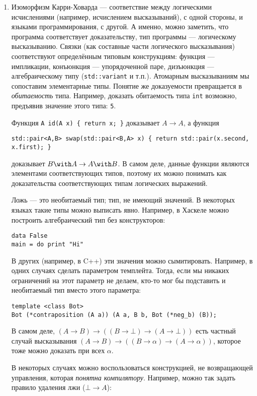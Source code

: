 \documentclass[10pt,a4paper,oneside]{article}
\begin{document}
\begin{enumerate}
\item Изоморфизм Карри-Ховарда --- соответствие между логическими исчислениями (например, исчислением высказываний), с одной стороны, и 
языками программирования, с другой. А именно, можно заметить, что программа соответствует доказательству, тип программы --- 
логическому высказыванию. Связки (как составные части логического высказывания) соответствуют определённым типовым конструкциям:
функция --- импликации, конъюнкция --- упорядоченной паре, дизъюнкция --- алгебраическому типу (\verb!std::variant! и т.п.).
Атомарным высказываниям мы сопоставим элементарные типы. Понятие же доказуемости превращается в \emph{обитаемость} типа.
Например, доказать обитаемость типа \verb!int! возможно, предъявив значение этого типа: \verb!5!.

Функция \verb!A id(A x) { return x; }! доказывает $A \rightarrow A$, а функция 
\begin{verbatim}
std::pair<A,B> swap(std::pair<B,A> x) { return std::pair(x.second, x.first); }
\end{verbatim}
доказывает $B\with A \rightarrow A \with B$. В самом деле, данные функции являются элементами соответствующих
типов, поэтому их можно понимать как доказательства соответствующих типам логических выражений.

Ложь --- это необитаемый тип; тип, не имеющий значений. В некоторых языках такие типы можно выписать
явно. Например, в Хаскеле можно построить алгебраический тип без конструкторов:

\begin{verbatim}
data False
main = do print "Hi"
\end{verbatim}

В других (например, в C++) эти значения можно сымитировать. Например, в одних случаях сделать параметром темплейта.
Тогда, если мы никаких ограничений на этот параметр не делаем, кто-то мог бы подставить и необитаемый тип вместо этого параметра:

\begin{verbatim}
template <class Bot>
Bot (*contraposition (A a)) (A a, B b, Bot (*neg_b) (B));
\end{verbatim}

В самом деле, $(A \rightarrow B) \rightarrow ((B \rightarrow \bot) \rightarrow (A \rightarrow \bot))$ есть частный
случай высказывания $(A \rightarrow B) \rightarrow ((B \rightarrow \alpha) \rightarrow (A \rightarrow \alpha))$, 
которое тоже можно доказать при всех $\alpha$.

В некоторых случаях можно воспользоваться конструкцией, не возвращающей управления, которая \emph{понятна компилятору}. Например, 
можно так задать правило удаления лжи ($\bot\rightarrow A$):


\end{enumerate}
\end{document}
